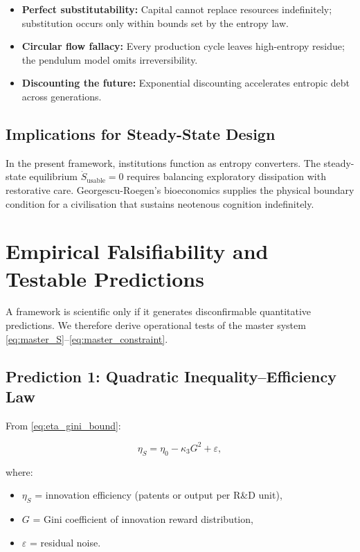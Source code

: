 \documentclass[12pt,a4paper]{article}
\theoremstyle{definition}
\begin{document}
\begin{itemize}[leftmargin=*]
  \item \textbf{Perfect substitutability:} Capital cannot replace resources
    indefinitely; substitution occurs only within bounds set by the entropy law.
  \item \textbf{Circular flow fallacy:} Every production cycle leaves
    high-entropy residue; the pendulum model omits irreversibility.
  \item \textbf{Discounting the future:} Exponential discounting accelerates
    entropic debt across generations.
\end{itemize}

\subsection{Implications for Steady-State Design}

In the present framework, institutions function as entropy converters.  The
steady-state equilibrium $\dot{S}_{\mathrm{usable}} = 0$ requires balancing
exploratory dissipation with restorative care.  Georgescu-Roegen's bioeconomics
supplies the physical boundary condition for a civilisation that sustains
neotenous cognition indefinitely.

\section{Empirical Falsifiability and Testable Predictions}
\label{sec:falsifiability}

A framework is scientific only if it generates disconfirmable
quantitative predictions.
We therefore derive operational tests of the master system
\eqref{eq:master_S}–\eqref{eq:master_constraint}.

\subsection{Prediction 1: Quadratic Inequality–Efficiency Law}

From \eqref{eq:eta_gini_bound}:

\begin{equation}
  \eta_S
  =
  \eta_0
  -
  \kappa_3 G^2
  + \varepsilon,
  \label{eq:test1}
\end{equation}

where:
\begin{itemize}
  \item $\eta_S$ = innovation efficiency (patents or output per R\&D unit),
  \item $G$ = Gini coefficient of innovation reward distribution,
  \item $\varepsilon$ = residual noise.
\end{itemize}
\end{document}
